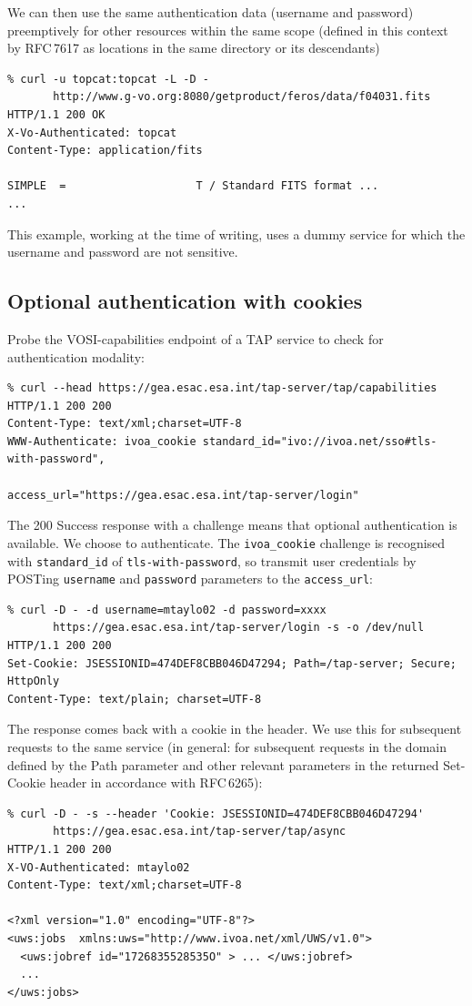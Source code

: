 \documentclass[11pt,a4paper]{ivoa}
\newcommand{\rfc}[1]{RFC\,#1}
\begin{document}
\noindent
We can then use the same authentication data (username and password)
preemptively for other resources within the same scope
(defined in this context by \rfc{7617} as locations in the same
directory or its descendants)
{\footnotesize
\begin{verbatim}
% curl -u topcat:topcat -L -D -
       http://www.g-vo.org:8080/getproduct/feros/data/f04031.fits
HTTP/1.1 200 OK
X-Vo-Authenticated: topcat
Content-Type: application/fits

SIMPLE  =                    T / Standard FITS format ...
...
\end{verbatim}
}

\noindent
This example, working at the time of writing, uses a dummy service for 
which the username and password are not sensitive.

\subsection{Optional authentication with cookies}

Probe the VOSI-capabilities endpoint of a TAP service to check
for authentication modality:
{\footnotesize
\begin{verbatim}
% curl --head https://gea.esac.esa.int/tap-server/tap/capabilities
HTTP/1.1 200 200
Content-Type: text/xml;charset=UTF-8
WWW-Authenticate: ivoa_cookie standard_id="ivo://ivoa.net/sso#tls-with-password",
                              access_url="https://gea.esac.esa.int/tap-server/login"
\end{verbatim}
}

\noindent
The 200 Success response with a challenge means that optional authentication
is available.
We choose to authenticate.
The \verb|ivoa_cookie| challenge is recognised with \verb|standard_id|
of \verb|tls-with-password|, so transmit user credentials
by POSTing \verb|username| and \verb|password| parameters
to the \verb|access_url|:
{\footnotesize
\begin{verbatim}
% curl -D - -d username=mtaylo02 -d password=xxxx
       https://gea.esac.esa.int/tap-server/login -s -o /dev/null
HTTP/1.1 200 200
Set-Cookie: JSESSIONID=474DEF8CBB046D47294; Path=/tap-server; Secure; HttpOnly
Content-Type: text/plain; charset=UTF-8
\end{verbatim}
}

\noindent
The response comes back with a cookie in the header.
We use this for subsequent requests to the same service
(in general: for subsequent requests in the domain defined by the Path
parameter and other relevant parameters in the returned Set-Cookie header
in accordance with \rfc{6265}):
{\footnotesize
\begin{verbatim}
% curl -D - -s --header 'Cookie: JSESSIONID=474DEF8CBB046D47294'
       https://gea.esac.esa.int/tap-server/tap/async
HTTP/1.1 200 200
X-VO-Authenticated: mtaylo02
Content-Type: text/xml;charset=UTF-8

<?xml version="1.0" encoding="UTF-8"?>
<uws:jobs  xmlns:uws="http://www.ivoa.net/xml/UWS/v1.0">
  <uws:jobref id="1726835528535O" > ... </uws:jobref>
  ...
</uws:jobs>
\end{verbatim}
}
\end{document}

